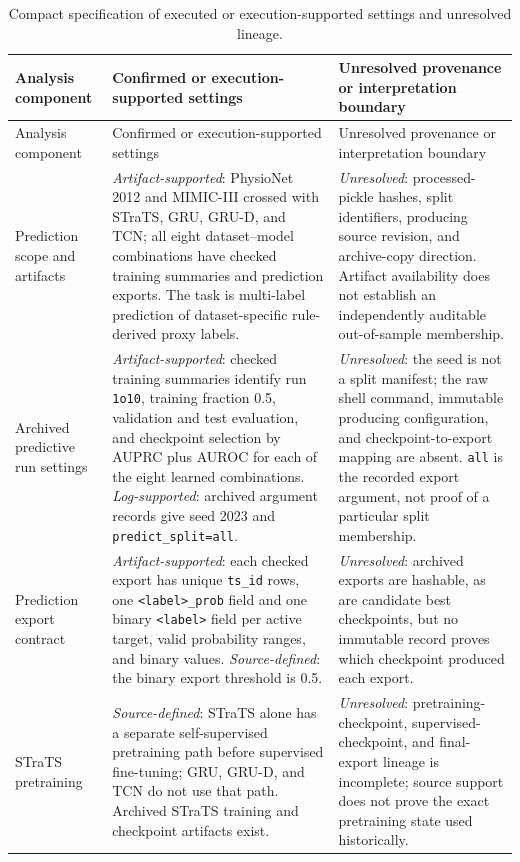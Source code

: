 \begingroup
\small
\singlespacing
\sloppy
\setlength{\tabcolsep}{3pt}
\begin{longtable}{@{}L{0.19\textwidth}L{0.42\textwidth}L{0.30\textwidth}@{}}
\caption[Executed settings and unresolved lineage.]{Compact specification of executed or execution-supported settings and unresolved lineage.}
\label{tab:executed-settings-provenance}\\
\toprule
Analysis component & Confirmed or execution-supported settings & Unresolved provenance or interpretation boundary \\
\midrule
\endfirsthead
\toprule
Analysis component & Confirmed or execution-supported settings & Unresolved provenance or interpretation boundary \\
\midrule
\endhead
\bottomrule
\endfoot
Prediction scope and artifacts & \emph{Artifact-supported}: PhysioNet 2012 and MIMIC-III crossed with STraTS, GRU, GRU-D, and TCN; all eight dataset--model combinations have checked training summaries and prediction exports.  The task is multi-label prediction of dataset-specific rule-derived proxy labels. & \emph{Unresolved}: processed-pickle hashes, split identifiers, producing source revision, and archive-copy direction.  Artifact availability does not establish an independently auditable out-of-sample membership. \\
Archived predictive run settings & \emph{Artifact-supported}: checked training summaries identify run \texttt{1o10}, training fraction 0.5, validation and test evaluation, and checkpoint selection by AUPRC plus AUROC for each of the eight learned combinations.  \emph{Log-supported}: archived argument records give seed 2023 and \texttt{predict\_split=all}. & \emph{Unresolved}: the seed is not a split manifest; the raw shell command, immutable producing configuration, and checkpoint-to-export mapping are absent.  \texttt{all} is the recorded export argument, not proof of a particular split membership. \\
Prediction export contract & \emph{Artifact-supported}: each checked export has unique \texttt{ts\_id} rows, one \texttt{<label>\_prob} field and one binary \texttt{<label>} field per active target, valid probability ranges, and binary values.  \emph{Source-defined}: the binary export threshold is 0.5. & \emph{Unresolved}: archived exports are hashable, as are candidate best checkpoints, but no immutable record proves which checkpoint produced each export. \\
STraTS pretraining & \emph{Source-defined}: STraTS alone has a separate self-supervised pretraining path before supervised fine-tuning; GRU, GRU-D, and TCN do not use that path.  Archived STraTS training and checkpoint artifacts exist. & \emph{Unresolved}: pretraining-checkpoint, supervised-checkpoint, and final-export lineage is incomplete; source support does not prove the exact pretraining state used historically. \\

\end{longtable}

